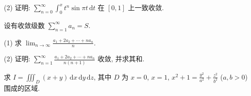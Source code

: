 (2) 证明: $\sum_{n=0}^{\infty} \int_{0}^{x} t^{n} \sin \pi t \, \mathrm{d}t$ 在 $[0,1]$ 上一致收敛.\par
设有收敛级数 $\sum_{n=1}^{\infty} a_n = S$.\par
(1) 求  $\lim_{n\to\infty}\frac{a_{1}+2a_{2}+\cdots+na_{n}}{n}.$\par
(2) 证明: $\sum_{n=1}^{\infty} \frac{a_1 + 2a_2 + \cdots + na_n}{n(n+1)}$ 收敛, 并求其和.\par
求 $I = \iiint_{D} (x + y) \, \mathrm{d}x \, \mathrm{d}y \, \mathrm{d}z$, 其中 $D$ 为 $x = 0$, $x = 1$, $x^2 + 1 = \frac{y^2}{a^2} + \frac{z^2}{b^2}$ ($a, b > 0$) 围成的区域.\par
